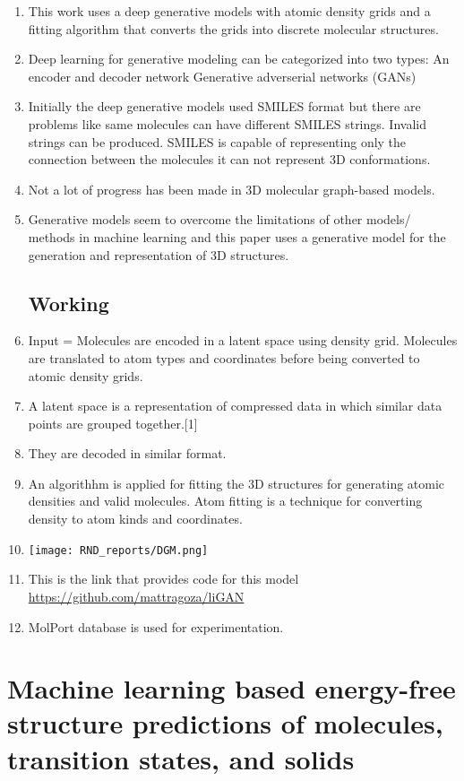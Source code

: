 \documentclass[]{report}
\begin{document}
\begin{enumerate}
	\item This work uses a deep generative models with atomic density grids and a fitting algorithm that converts the grids into discrete molecular structures. 
	\item Deep learning for generative modeling can be categorized into two types:
	\subitem An encoder and  decoder network
	\subitem Generative adverserial networks (GANs)
	\item Initially the deep generative models used SMILES format but there are problems like same molecules can have different SMILES strings. Invalid strings can be produced. SMILES is capable of representing only the connection between the molecules it can not represent 3D conformations.
	\item Not a lot of progress has been made in  3D molecular graph-based models.
	 \item Generative models seem to overcome the limitations of other models/ methods in machine learning and this paper uses a generative model for the generation and representation of 3D structures.
	 \subsection{Working}
	 \item Input = Molecules are encoded in a latent space using density grid. Molecules are translated to atom types and coordinates before being converted to atomic density grids.
	 \item A latent space is a representation of compressed data in which similar data points are grouped together.[1]
	 \item They are decoded in similar format.
	 \item An algorithhm is applied for fitting the 3D structures for generating atomic densities and valid molecules. Atom fitting is a technique for converting density to atom kinds and coordinates.
	 \item 	\texttt{[image: RND\_reports/DGM.png]}
	 \item This is the link that provides code for this model \href{ https://github.com/mattragoza/liGAN}{ https://github.com/mattragoza/liGAN} 
	 \item MolPort database is used for experimentation.
\end{enumerate}


\section{Machine learning based energy-free structure
predictions of molecules, transition states, and solids}
\end{document}
